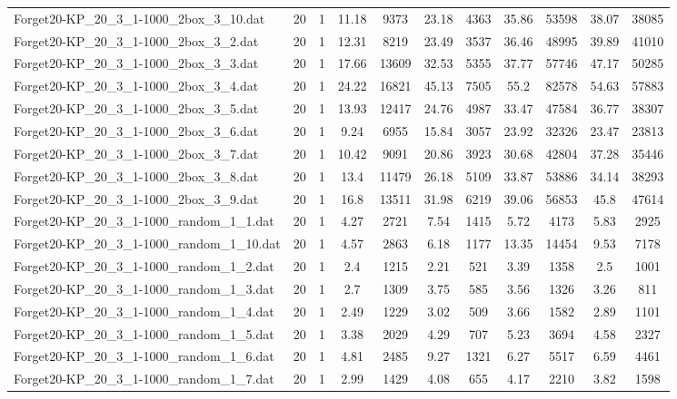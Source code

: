 \begin{table}[!ht]
\begin{tabular}{lcccccccccc}
Forget20-KP\_20\_3\_1-1000\_2box\_3\_10.dat & 20 & 1 & 11.18 & 9373 & 23.18 & 4363 & 35.86 & 53598 & 38.07 & 38085 \\
Forget20-KP\_20\_3\_1-1000\_2box\_3\_2.dat & 20 & 1 & 12.31 & 8219 & 23.49 & 3537 & 36.46 & 48995 & 39.89 & 41010 \\
Forget20-KP\_20\_3\_1-1000\_2box\_3\_3.dat & 20 & 1 & 17.66 & 13609 & 32.53 & 5355 & 37.77 & 57746 & 47.17 & 50285 \\
Forget20-KP\_20\_3\_1-1000\_2box\_3\_4.dat & 20 & 1 & 24.22 & 16821 & 45.13 & 7505 & 55.2 & 82578 & 54.63 & 57883 \\
Forget20-KP\_20\_3\_1-1000\_2box\_3\_5.dat & 20 & 1 & 13.93 & 12417 & 24.76 & 4987 & 33.47 & 47584 & 36.77 & 38307 \\
Forget20-KP\_20\_3\_1-1000\_2box\_3\_6.dat & 20 & 1 & 9.24 & 6955 & 15.84 & 3057 & 23.92 & 32326 & 23.47 & 23813 \\
Forget20-KP\_20\_3\_1-1000\_2box\_3\_7.dat & 20 & 1 & 10.42 & 9091 & 20.86 & 3923 & 30.68 & 42804 & 37.28 & 35446 \\
Forget20-KP\_20\_3\_1-1000\_2box\_3\_8.dat & 20 & 1 & 13.4 & 11479 & 26.18 & 5109 & 33.87 & 53886 & 34.14 & 38293 \\
Forget20-KP\_20\_3\_1-1000\_2box\_3\_9.dat & 20 & 1 & 16.8 & 13511 & 31.98 & 6219 & 39.06 & 56853 & 45.8 & 47614 \\
Forget20-KP\_20\_3\_1-1000\_random\_1\_1.dat & 20 & 1 & 4.27 & 2721 & 7.54 & 1415 & 5.72 & 4173 & 5.83 & 2925 \\
Forget20-KP\_20\_3\_1-1000\_random\_1\_10.dat & 20 & 1 & 4.57 & 2863 & 6.18 & 1177 & 13.35 & 14454 & 9.53 & 7178 \\
Forget20-KP\_20\_3\_1-1000\_random\_1\_2.dat & 20 & 1 & 2.4 & 1215 & 2.21 & 521 & 3.39 & 1358 & 2.5 & 1001 \\
Forget20-KP\_20\_3\_1-1000\_random\_1\_3.dat & 20 & 1 & 2.7 & 1309 & 3.75 & 585 & 3.56 & 1326 & 3.26 & 811 \\
Forget20-KP\_20\_3\_1-1000\_random\_1\_4.dat & 20 & 1 & 2.49 & 1229 & 3.02 & 509 & 3.66 & 1582 & 2.89 & 1101 \\
Forget20-KP\_20\_3\_1-1000\_random\_1\_5.dat & 20 & 1 & 3.38 & 2029 & 4.29 & 707 & 5.23 & 3694 & 4.58 & 2327 \\
Forget20-KP\_20\_3\_1-1000\_random\_1\_6.dat & 20 & 1 & 4.81 & 2485 & 9.27 & 1321 & 6.27 & 5517 & 6.59 & 4461 \\
Forget20-KP\_20\_3\_1-1000\_random\_1\_7.dat & 20 & 1 & 2.99 & 1429 & 4.08 & 655 & 4.17 & 2210 & 3.82 & 1598 \\

\end{tabular}
\end{table}
